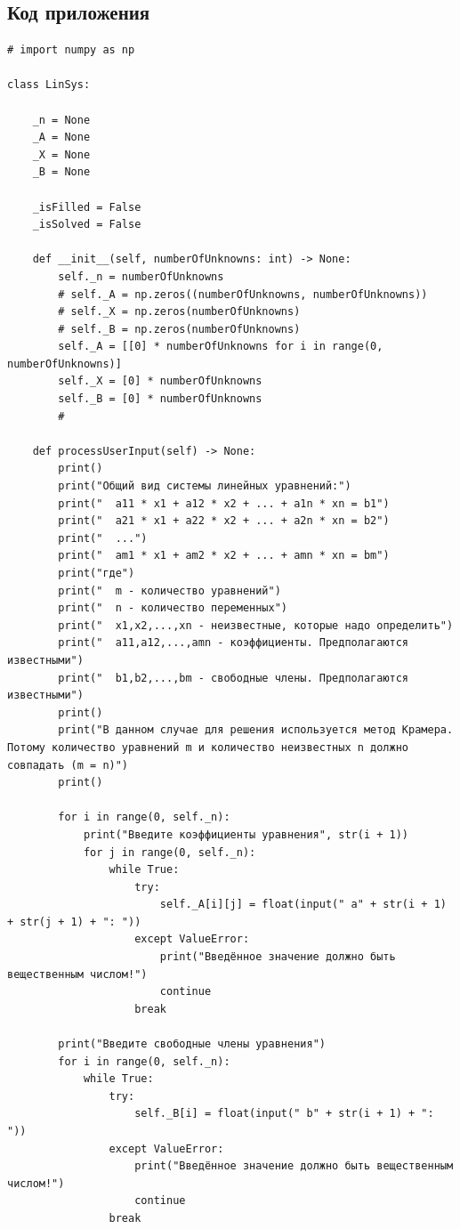 \documentclass[12pt,a4paper]{scrartcl}
\begin{document}
\subsection{Код приложения}
\label{sec:exp:code}
\begin{verbatim}
# import numpy as np

class LinSys:

    _n = None
    _A = None
    _X = None
    _B = None

    _isFilled = False
    _isSolved = False

    def __init__(self, numberOfUnknowns: int) -> None:
        self._n = numberOfUnknowns
        # self._A = np.zeros((numberOfUnknowns, numberOfUnknowns))
        # self._X = np.zeros(numberOfUnknowns)
        # self._B = np.zeros(numberOfUnknowns)
        self._A = [[0] * numberOfUnknowns for i in range(0, numberOfUnknowns)]
        self._X = [0] * numberOfUnknowns
        self._B = [0] * numberOfUnknowns
        # 

    def processUserInput(self) -> None:
        print()
        print("Общий вид системы линейных уравнений:")
        print("  a11 * x1 + a12 * x2 + ... + a1n * xn = b1")
        print("  a21 * x1 + a22 * x2 + ... + a2n * xn = b2")
        print("  ...")
        print("  am1 * x1 + am2 * x2 + ... + amn * xn = bm")
        print("где")
        print("  m - количество уравнений")
        print("  n - количество переменных")
        print("  x1,x2,...,xn - неизвестные, которые надо определить")
        print("  a11,a12,...,amn - коэффициенты. Предполагаются известными")
        print("  b1,b2,...,bm - свободные члены. Предполагаются известными")
        print()
        print("В данном случае для решения используется метод Крамера. Потому количество уравнений m и количество неизвестных n должно совпадать (m = n)")
        print()

        for i in range(0, self._n):
            print("Введите коэффициенты уравнения", str(i + 1))
            for j in range(0, self._n):
                while True:
                    try:
                        self._A[i][j] = float(input(" a" + str(i + 1) + str(j + 1) + ": "))
                    except ValueError:
                        print("Введённое значение должно быть вещественным числом!")
                        continue
                    break

        print("Введите свободные члены уравнения")
        for i in range(0, self._n):
            while True:
                try:
                    self._B[i] = float(input(" b" + str(i + 1) + ": "))
                except ValueError:
                    print("Введённое значение должно быть вещественным числом!")
                    continue
                break
        

\end{verbatim}
\end{document}
